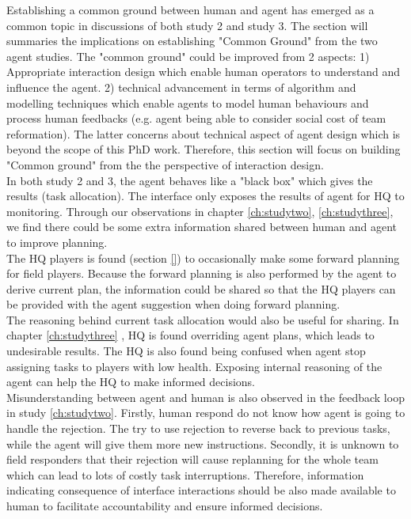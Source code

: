 Establishing a common ground between human and agent has emerged as a common topic in discussions of both study 2 and study 3. The section will summaries the implications on establishing "Common Ground" from the two agent studies. The "common ground" could be improved from 2 aspects:  1) Appropriate interaction design which enable human operators to understand and influence the agent. 2) technical advancement in terms of algorithm and modelling techniques which enable agents to model human behaviours and process human feedbacks (e.g. agent being able to consider social cost of team reformation). The latter concerns about technical aspect of agent design which is beyond the scope of this PhD work. Therefore, this section will focus on building "Common ground" from the the perspective of interaction design. \\

In both study 2 and 3, the agent behaves like a "black box" which gives the results (task allocation). The interface only exposes the results of agent for HQ to monitoring. Through our observations in chapter \ref{ch:studytwo}, \ref{ch:studythree}, we find there could be some extra information shared between human and agent to improve planning.\\

The HQ players is found (section \ref{}) to occasionally make some forward planning for field players. Because the forward planning is also performed by the agent to derive current plan, the information could be shared so that the HQ players can be provided with the agent suggestion when doing forward planning.\\

The reasoning behind current task allocation would also be useful for sharing. In chapter \ref{ch:studythree} , HQ is found overriding agent plans, which leads to undesirable results. The HQ is also found being confused when agent stop assigning tasks to players with low health. Exposing internal reasoning of the agent can help the HQ to make informed decisions. \\

Misunderstanding between agent and human is also observed in the feedback loop in study \ref{ch:studytwo}. Firstly, human respond do not know how agent is going to handle the rejection. The try to use rejection to reverse back to previous tasks, while the agent will give them more new instructions. Secondly, it is unknown to field responders that their rejection will cause replanning for the whole team which can lead to lots of costly task interruptions. Therefore, information indicating consequence of interface interactions should be also made available to human to facilitate accountability and ensure informed decisions. \\


